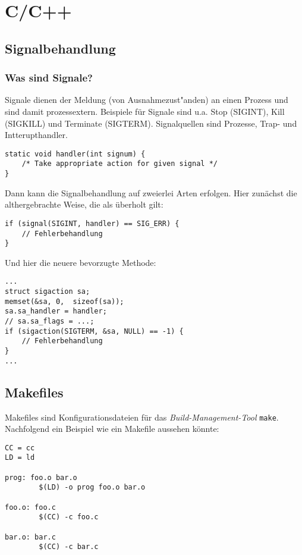 \section{C/C++}

\subsection{Signalbehandlung}

\subsubsection{Was sind Signale?}
Signale dienen der Meldung (von Ausnahmezust"anden) an einen Prozess und sind damit prozessextern. Beispiele für Signale sind u.a. Stop (SIGINT), Kill (SIGKILL) und Terminate (SIGTERM). Signalquellen sind Prozesse, Trap- und Intterupthandler.

\begin{lstlisting}
static void handler(int signum) {
    /* Take appropriate action for given signal */
}
\end{lstlisting}

Dann kann die Signalbehandlung auf zweierlei Arten erfolgen. Hier zunächst die althergebrachte Weise, die als überholt gilt:

\begin{lstlisting}
if (signal(SIGINT, handler) == SIG_ERR) {
	// Fehlerbehandlung
}
\end{lstlisting}

Und hier die neuere bevorzugte Methode:
\begin{lstlisting}
...
struct sigaction sa;
memset(&sa, 0,  sizeof(sa));
sa.sa_handler = handler;
// sa.sa_flags = ...;
if (sigaction(SIGTERM, &sa, NULL) == -1) {
	// Fehlerbehandlung
}
...
\end{lstlisting}

\subsection{Makefiles}
Makefiles sind Konfigurationsdateien für das \textit{Build-Management-Tool} \texttt{make}. Nachfolgend ein Beispiel wie ein Makefile aussehen könnte:

\begin{verbatim}
CC = cc
LD = ld
 
prog: foo.o bar.o
        $(LD) -o prog foo.o bar.o
 
foo.o: foo.c
        $(CC) -c foo.c
 
bar.o: bar.c
        $(CC) -c bar.c
\end{verbatim}

